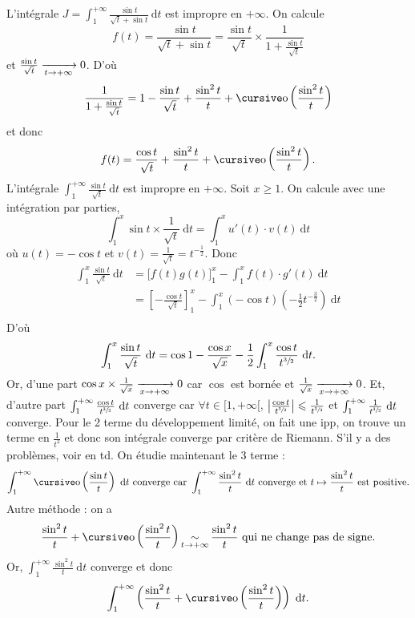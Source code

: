 L'intégrale $J = \int_{1}^{+\infty} \frac{\sin t}{\sqrt{t} + \sin t}~\mathrm{d}t$\/ est impropre en $+\infty$. On calcule
\[
	f(t) = \frac{\sin t}{\sqrt{t} + \sin t} = \frac{\sin t}{\sqrt{t}} \times \frac{1}{1+\frac{\sin t}{\sqrt{t}}}
\] et $\frac{\sin t}{\sqrt{t}} \xrightarrow[t\to +\infty]{} 0$. D'où \[
	\frac{1}{1+\frac{\sin t}{\sqrt{t}}} = 1  - \frac{\sin t}{\sqrt{t}} + \frac{\sin^2 t}{t} + \po\left( \frac{\sin^2 t}{t} \right)
\] et donc \[
	f(t) = \frac{\cos t}{\sqrt{t}} + \frac{\sin^2 t}{t} + \po\left( \frac{\sin^2 t}{t} \right)
.\]
L'intégrale $\int_{1}^{+\infty} \frac{\sin t}{\sqrt{t}}~\mathrm{d}t$\/ est impropre en $+\infty$.
Soit $x \ge 1$. On calcule avec une intégration par parties,
\[
	\int_{1}^{x} \sin t \times \frac{1}{\sqrt{t}}~\mathrm{d}t = \int_{1}^{x} u'(t)\cdot v(t)~\mathrm{d}t
\] où $u(t) = - \cos t$\/ et $v(t) = \frac{1}{\sqrt{t}} = t^{-\frac{1}{2}}$. Donc
\begin{align*}
	\int_{1}^{x} \frac{\sin t}{\sqrt{t}}~\mathrm{d}t &= \Big[f(t)g(t)\Big]_1^x - \int_{1}^{x} f(t)\cdot g'(t)~\mathrm{d}t\\
	&= \left[ - \frac{\cos t}{\sqrt{t}} \right]_1^x - \int_{1}^{x} (-\cos t)\left( -\frac{1}{2}t^{-\frac{3}{2}} \right)~\mathrm{d}t \\
\end{align*}
D'où \[
	\int_{1}^{x} \frac{\sin t}{\sqrt{t}}~\mathrm{d}t = \cos 1 - \frac{\cos x}{\sqrt{x}} - \frac{1}{2} \int_{1}^{x} \frac{\cos t}{t^{\sfrac{3}{2}}}~\mathrm{d}t
.\]
Or, d'une part $\cos x \times \frac{1}{\sqrt{x}} \xrightarrow[x\to +\infty]{} 0$\/ car $\cos$\/ est bornée et $\frac{1}{\sqrt{x}}\xrightarrow[x\to +\infty]{} 0$.
Et, d'autre part $\int_{1}^{+\infty} \frac{\cos t}{t^{\sfrac{3}{2}}}~\mathrm{d}t$\/ converge car $\forall t \in [1,+\infty[$, $\left| \frac{\cos t}{t^{\sfrac{3}{2}}} \right| \leqslant \frac{1}{t^{\sfrac{3}{2}}}$\/ et $\int_{1}^{+\infty} \frac{1}{t^{\sfrac{3}{2}}}~\mathrm{d}t$\/ converge.
Pour le 2 terme du développement limité, on fait une {\sc ipp}, on trouve un terme en $\frac{1}{t^2}$\/ et donc son intégrale converge par critère de {\sc Riemann}. S'il y a des problèmes, voir en {\sc td}.
On étudie maintenant le 3 terme : \[
	\int_{1}^{+\infty}  \po\left( \frac{\sin t}{t} \right) ~\mathrm{d}t \text{ converge car } \int_{1}^{+\infty} \frac{\sin^2 t}{t} ~\mathrm{d}t \text{ converge et } t\mapsto \frac{\sin^2 t}{t} \text{ est positive}.
\]
Autre méthode : on a \[
	\frac{\sin^2 t}{t} + \po\left( \frac{\sin^2 t}{t} \right) \simi_{t\to +\infty} \frac{\sin^2 t}{t} \text{ qui ne change pas de signe}
.\] Or, $\int_{1}^{+\infty} \frac{\sin^2 t}{t}~\mathrm{d}t$\/ converge et donc \[
	\int_{1}^{+\infty} \left( \frac{\sin^2 t}{t} + \po\left( \frac{\sin^2 t}{t} \right) \right) ~\mathrm{d}t
.\]

